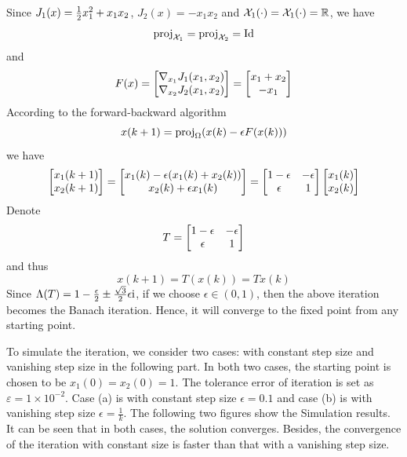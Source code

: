 \documentclass[a4 paper, 12pt]{article}
\begin{document}
Since $J_1(x) = \frac{1}{2} x_1^2 + x_1x_2$, $J_2(x)= -x_1x_2$ and $\mathcal{X}_1(\cdot)=\mathcal{X}_1(\cdot)=\mathbb{R}$, we have 
\begin{equation}
        \textnormal{proj}_{\mathcal{X}_1} = \textnormal{proj}_{\mathcal{X}_2} = \textnormal{Id}
\end{equation}
and 
\begin{equation}
        F(x) = \begin{bmatrix} \nabla_{x_1} J_1(x_1,x_2)  \\ \nabla_{x_2}J_2(x_1,x_2) \end{bmatrix} = \begin{bmatrix} x_1+x_2 \\ -x_1 \end{bmatrix}
\end{equation}
According to the forward-backward algorithm
\begin{equation}
        x(k+1) = \textnormal{proj}_{\Omega}(x(k) - \epsilon F(x(k)))
\end{equation}
we have 
\begin{equation}
        \begin{bmatrix} x_1(k+1) \\ x_2(k+1) \end{bmatrix} = \begin{bmatrix} x_1(k)-\epsilon(x_1(k)+x_2(k)) \\ x_2(k) + \epsilon x_1(k) \end{bmatrix} = \begin{bmatrix} 1-\epsilon &-\epsilon \\ \epsilon &1 \end{bmatrix} \begin{bmatrix} x_1(k) \\ x_2(k) \end{bmatrix}
\end{equation}
Denote
\begin{equation}
        T = \begin{bmatrix} 1-\epsilon &-\epsilon \\ \epsilon &1 \end{bmatrix}
\end{equation}
and thus
\begin{equation}
        x(k+1) = T(x(k)) = Tx(k)
\end{equation}
Since $\Lambda(T) = 1 - \frac{\epsilon}{2} \pm \frac{\sqrt{3}}{2}\epsilon \textnormal{i}$, if we choose $\epsilon \in (0,1)$, then the above iteration becomes the Banach iteration. Hence, it will converge to the fixed point from any starting point. 

To simulate the iteration, we consider two cases: with constant step size and vanishing step size in the following part. In both two cases, the starting point is chosen to be $x_1(0) = x_2(0) = 1$. The tolerance error of iteration is set as $\varepsilon = 1\times10^{-2}$. Case (a) is with constant step size $\epsilon = 0.1$ and case (b) is with vanishing step size $\epsilon = \frac{1}{k}$. The following two figures show the Simulation results. It can be seen that in both cases, the solution converges. Besides, the convergence of the iteration with constant size is faster than that with a vanishing step size.
\end{document}
